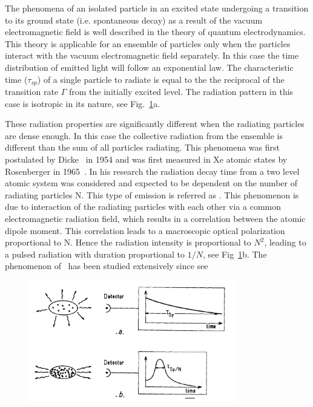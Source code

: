 The phenomena of an isolated particle in an excited state undergoing a transition to its ground state (i.e. spontaneous decay) as a result of the vacuum electromagnetic field  is well described in the theory of quantum electrodynamics. This theory is applicable for an ensemble of particles only when the particles interact with the vacuum electromagnetic field separately. In this case the time distribution of emitted light will follow an exponential law. The characteristic time ($\tau_{sp}$) of a single particle to radiate is equal to the the reciprocal of the transition rate $\Gamma$ from the initially excited level. The radiation pattern in this case is isotropic in its nature, see Fig.~\ref{fig:emissionType}a. 

These radiation properties are significantly different when the radiating particles are dense enough. In this case the collective radiation from  the ensemble is different than the sum of all particles radiating. This phenomena was first postulated by Dicke~\cite{DickeSR} in 1954 and was first measured in Xe atomic states by Rosenberger in 1965~\cite{FirstMeasure}. In his research the radiation decay time from a two level atomic system was considered and expected to be dependent on the number of radiating particles N. This type of emission is referred as \superradiance. This phenomenon is due to interaction of the radiating particles with each other via a common electromagnetic radiation field, which results in a correlation between the atomic dipole moment. This correlation leads to a macroscopic optical polarization proportional to N. Hence the radiation intensity is proportional to $N^2$, leading to a pulsed radiation with duration proportional to $1/N$, see Fig~\ref{fig:emissionType}b. The phenomenon of \superradiance\ has been studied extensively since see~\cite{Gross1982301,benedict1996super}  
\begin{figure}[t!]
	\centering
	\includegraphics[width=0.8\textwidth]{figs/emissionTypes.png}
	\label{fig:emissionType}
\end{figure}


